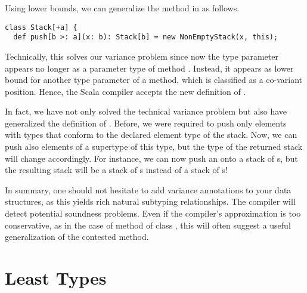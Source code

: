 \documentclass[a4paper,12pt,twoside,titlepage]{book}
\begin{document}
Using lower bounds, we can generalize the  method in
 as follows.
\begin{lstlisting}
class Stack[+a] {
  def push[b >: a](x: b): Stack[b] = new NonEmptyStack(x, this);
\end{lstlisting}
Technically, this solves our variance problem since now the type
parameter  appears no longer as a parameter type of method
. Instead, it appears as lower bound for another type
parameter of a method, which is classified as a co-variant position.
Hence, the Scala compiler accepts the new definition of .

In fact, we have not only solved the technical variance problem but
also have generalized the definition of .  Before, we were
required to push only elements with types that conform to the declared
element type of the stack. Now, we can push also elements of a
supertype of this type, but the type of the returned stack will change
accordingly. For instance, we can now push an  onto a
stack of s, but the resulting stack will be a stack of
s instead of a stack of s!

In summary, one should not hesitate to add variance annotations to
your data structures, as this yields rich natural subtyping
relationships. The compiler will detect potential soundness
problems. Even if the compiler's approximation is too conservative, as
in the case of method  of class , this will
often suggest a useful generalization of the contested method.

\section{Least Types}
\end{document}
